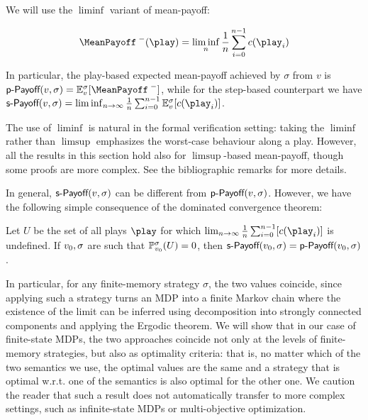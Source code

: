 \newcommand{\MeanPayoffOld}{\MeanPayoff}

We will use the $\liminf$ variant of mean-payoff:

\[
\MeanPayoffInf(\play) = \liminf_n \frac{1}{n} \sum_{i = 0}^{n-1} c(\play_i)
\]

In particular, the play-based expected mean-payoff achieved by $ \sigma $ from $ v $ is $ \playPay(v, \sigma) = \expv_v^\sigma[\MeanPayoffInf] $, while for the step-based counterpart we have $ \stepPay(v, \sigma) = \liminf_{n \rightarrow \infty} \frac{1}{n} \sum_{i=0}^{n-1} \expv_v^\sigma[\colouring(\play_i)]$.

The use of $ \liminf $ is natural in the formal verification setting: taking the $\liminf$ rather than $ \limsup $ emphasizes the worst-case behaviour along a play. However, all the results in this section hold also for $\limsup$-based mean-payoff, though some proofs are more complex. See the bibliographic remarks for more details.
%

In general, $\textsf{s-Payoff}(v,\sigma)$ can be different from $ \textsf{p-Payoff}(v, \sigma) $. However, we have the following simple consequence of the dominated convergence theorem:
\begin{lemma}
	\label{5-lem:limit-defined}
Let $U$ be the set of all plays $\play$  for which $\lim_{n\rightarrow \infty} \frac{1}{n} \sum_{i=0}^{n-1}[\colouring(\play_i)]$ is undefined. If $v_0,\sigma$ are such that $\mathbb{P}^\sigma_{v_0}(U) = 0$, then $\textsf{s-Payoff}(v_0,\sigma) = \textsf{p-Payoff}(v_0, \sigma) $.
\end{lemma}


In particular, for any finite-memory strategy $ \sigma $, the two values coincide, since applying such a strategy turns an MDP into a finite Markov chain where the existence of the limit can be inferred using decomposition into strongly connected components and applying the Ergodic theorem.
We will show that in our case of finite-state MDPs, the two approaches coincide not only at the levels of finite-memory strategies, but also as optimality criteria: that is, no matter which of the two semantics we use, the optimal values are the same and a strategy that is optimal w.r.t. one of the semantics is also optimal for the other one. We caution the reader that such a result does not automatically transfer to more complex settings, such as infinite-state MDPs or multi-objective optimization. 

